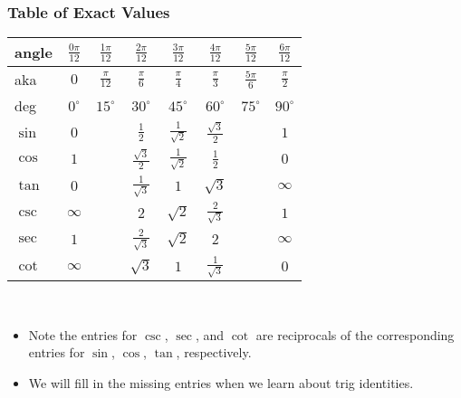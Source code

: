 \documentclass[serif,ignorenonframetext]{beamer}
\begin{document}
\begin{frame}
  \frametitle{Table of Exact Values}
  \centering
  \begin{tabular}{|l||c|c|c|c|c|c|c|}
    \hline
    angle  & $\frac{0\pi}{12}$ &
    $\frac{1\pi}{12}$    & $\frac{2\pi}{12}$    & $\frac{3\pi}{12}$    & 
    $\frac{4\pi}{12}$    & $\frac{5\pi}{12}$    & $\frac{6\pi}{12}$    \\
    \hline
    aka    & $0$               &
    $\frac{\pi}{12}$     & $\frac{\pi}{6}$      & $\frac{\pi}{4}$      &
    $\frac{\pi}{3}$      & $\frac{5\pi}{6}$     & $\frac{\pi}{2}$      \\
    \hline
    deg    & $0^{\circ}$         &
    $15^{\circ}$           & $30^{\circ}$           & $45^{\circ}$          &
    $60^{\circ}$           & $75^{\circ}$           & $90^{\circ}$          \\
    \hline\hline
    $\sin$ & $0$               &
                         & $\frac{1}{2}$        & $\frac{1}{\sqrt{2}}$ &
    $\frac{\sqrt{3}}{2}$ &                      & $1$                  \\
    \hline
    $\cos$ & $1$               &
                         & $\frac{\sqrt{3}}{2}$ & $\frac{1}{\sqrt{2}}$ &
    $\frac{1}{2}$        &                      & $0$                  \\
    \hline
    $\tan$ & $0$               &
                         & $\frac{1}{\sqrt{3}}$ & $1$                  &
    $\sqrt{3}$           &                      & $\infty$             \\
    \hline\hline
    $\csc$ & $\infty$          &
                         & $2$                  & $\sqrt{2}$           &
    $\frac{2}{\sqrt{3}}$ &                      & $1$                  \\
    \hline
    $\sec$ & $1$               &
                         & $\frac{2}{\sqrt{3}}$ & $\sqrt{2}$           &
    $2$                  &                      & $\infty$             \\
    \hline
    $\cot$ & $\infty$          &
                         & $\sqrt{3}$           & $1$                  &
    $\frac{1}{\sqrt{3}}$ &                      & $0$                  \\
    \hline
  \end{tabular}
  \\
  \begin{itemize}
  \item Note the entries for $\csc$, $\sec$, and $\cot$ are reciprocals of the corresponding entries for $\sin$, $\cos$, $\tan$, respectively.
  \item We will fill in the missing entries when we learn about trig identities.
  \end{itemize}
\end{frame}
\end{document}
